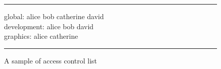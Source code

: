 \begin{figure}[htb]
\small
\rule{\linewidth}{.08em}

global: alice bob catherine david \\
development: alice bob david \\
graphics: alice catherine \\


\rule{\linewidth}{.08em}
\caption{A sample of access control list}
\label{f:access-list}
\end{figure}

\endinput

